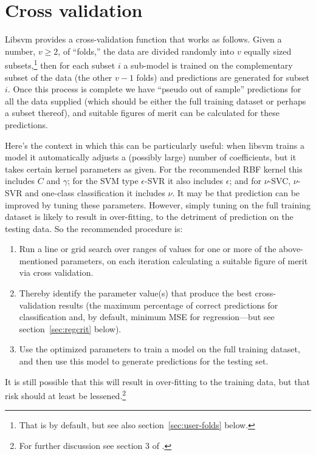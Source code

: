 \documentclass{article}
\begin{document}
\section{Cross validation}
\label{sec:xvalid}

\textsf{Libsvm} provides a cross-validation function that works as
follows. Given a number, $v \geq 2$, of ``folds,'' the data are
divided randomly into $v$ equally sized subsets,\footnote{That is by
  default, but see also section~\ref{sec:user-folds} below.} then
for each subset $i$ a sub-model is trained on the complementary subset
of the data (the other $v-1$ folds) and predictions are generated for
subset $i$. Once this process is complete we have ``pseudo out of
sample'' predictions for all the data supplied (which should be either
the full training dataset or perhaps a subset thereof), and suitable
figures of merit can be calculated for these predictions.

Here's the context in which this can be particularly useful: when
\textsf{libsvm} trains a model it automatically adjusts a (possibly
large) number of coefficients, but it takes certain kernel parameters
as given. For the recommended RBF kernel this includes $C$ and
$\gamma$; for the SVM type $\epsilon$-SVR it also includes $\epsilon$;
and for $\nu$-SVC, $\nu$-SVR and one-class classification it includes
$\nu$. It may be that prediction can be improved by tuning these
parameters. However, simply tuning on the full training dataset is
likely to result in over-fitting, to the detriment of prediction on
the testing data. So the recommended procedure is:
\begin{enumerate}
\item Run a line or grid search over ranges of values for one or more
  of the above-mentioned parameters, on each iteration calculating a
  suitable figure of merit via cross validation.
\item Thereby identify the parameter value(s) that produce the best
  cross-validation results (the maximum percentage of correct
  predictions for classification and, by default, minimum MSE for
  regression---but see section~\ref{sec:regcrit} below).
\item Use the optimized parameters to train a model on the full
  training dataset, and then use this model to generate predictions
  for the testing set.
\end{enumerate}

It is still possible that this will result in over-fitting to the
training data, but that risk should at least be lessened.\footnote{For
  further discussion see section 3 of \cite{HCL16}.}
\end{document}
